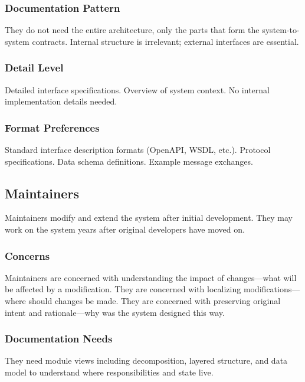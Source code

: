 \documentclass[11pt]{article}
\begin{document}
\subsubsection{Documentation Pattern}

They do not need the entire architecture, only the parts that form the system-to-system contracts. Internal structure is irrelevant; external interfaces are essential.

\subsubsection{Detail Level}

Detailed interface specifications. Overview of system context. No internal implementation details needed.

\subsubsection{Format Preferences}

Standard interface description formats (OpenAPI, WSDL, etc.). Protocol specifications. Data schema definitions. Example message exchanges.

\subsection{Maintainers}

Maintainers modify and extend the system after initial development. They may work on the system years after original developers have moved on.

\subsubsection{Concerns}

Maintainers are concerned with understanding the impact of changes---what will be affected by a modification. They are concerned with localizing modifications---where should changes be made. They are concerned with preserving original intent and rationale---why was the system designed this way.

\subsubsection{Documentation Needs}

They need module views including decomposition, layered structure, and data model to understand where responsibilities and state live.
\end{document}

